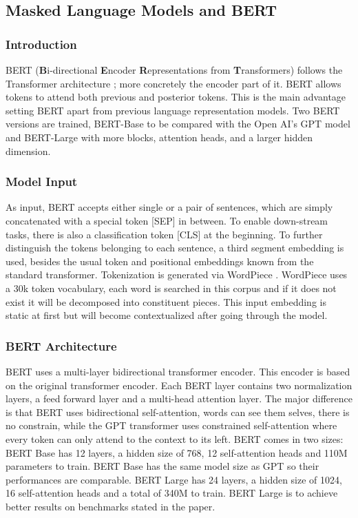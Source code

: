 \documentclass[11pt, a4paper]{amsart}
\begin{document}
\subsection{Masked Language Models and BERT}

\subsubsection{Introduction}

BERT (\textbf{B}i-directional \textbf{E}ncoder \textbf{R}epresentations from \textbf{T}ransformers) follows the Transformer architecture \cite{DBLP:journals/corr/VaswaniSPUJGKP17}; more concretely the encoder part of it. 
BERT allows tokens to attend both previous and posterior tokens. 
This is the main advantage setting BERT apart from previous language representation models. 
Two BERT versions are trained, BERT-Base to be compared with the Open AI's GPT model and BERT-Large with more blocks, attention heads, and a larger hidden dimension.

\subsubsection{Model Input}

As input, BERT accepts either single or a pair of sentences, which are simply concatenated with a special token [SEP] in between.
To enable down-stream tasks, there is also a classification token [CLS] at the beginning.
To further distinguish the tokens belonging to each sentence, a third segment embedding is used, besides the usual token and positional embeddings known from the standard transformer. 
Tokenization is generated via WordPiece \cite{wu2016google}. 
WordPiece uses a 30k token vocabulary, each word is searched in this corpus and if it does not exist it will be decomposed into constituent pieces. 
This input embedding is static at first but will become contextualized after going through the model.

\subsubsection {BERT Architecture}

BERT uses a multi-layer bidirectional transformer encoder. 
This encoder is based on the original transformer encoder. 
Each BERT layer contains two normalization layers, a feed forward layer and a multi-head attention layer. 
The major difference is that BERT uses bidirectional self-attention, words can see them selves, there is no constrain, while the GPT transformer uses constrained self-attention where every token can only attend to the context to its left. 
BERT comes in two sizes:
BERT Base has 12 layers, a hidden size of 768, 12 self-attention heads and 110M parameters to train. 
BERT Base has the same model size as GPT so their performances are comparable. 
BERT Large has 24 layers, a hidden size of 1024, 16 self-attention heads and a total of 340M to train. 
BERT Large is to achieve better results on benchmarks stated in the paper.
\end{document}
